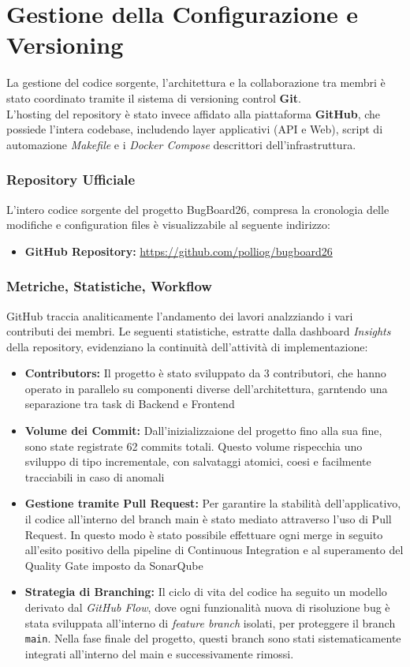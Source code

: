 \newpage
\chapter{Gestione della Configurazione e Versioning}
La gestione del codice sorgente, l'architettura e la collaborazione tra membri è stato coordinato tramite il sistema di versioning control \textbf{Git}. \\
L'hosting del repository è stato invece affidato alla piattaforma \textbf{GitHub}, che possiede l'intera codebase, includendo layer applicativi (API e Web), script di automazione \textit{Makefile} e i \textit{Docker Compose} descrittori dell'infrastruttura.

\subsection{Repository Ufficiale}
L'intero codice sorgente del progetto BugBoard26, compresa la cronologia delle modifiche e configuration files è visualizzabile al seguente indirizzo:
\begin{itemize}
    \item \textbf{GitHub Repository:} \url{https://github.com/polliog/bugboard26}
\end{itemize}

\subsection{Metriche, Statistiche, Workflow}
GitHub traccia analiticamente l'andamento dei lavori analzziando i vari contributi dei membri. Le seguenti statistiche, estratte dalla dashboard \textit{Insights} della repository, evidenziano la continuità dell'attività di implementazione:
\begin{itemize}
    \item \textbf{Contributors:} Il progetto è stato sviluppato da 3 contributori, che hanno operato in parallelo su componenti diverse dell'architettura, garntendo una separazione tra task di Backend e Frontend
    \item \textbf{Volume dei Commit:} Dall'inizializzaione del progetto fino alla sua fine, sono state registrate 62 commits totali. Questo volume rispecchia uno sviluppo di tipo incrementale, con salvataggi atomici, coesi e facilmente tracciabili in caso di anomali
    \item \textbf{Gestione tramite Pull Request:} Per garantire la stabilità dell'applicativo, il codice all'interno del branch main è stato mediato attraverso l'uso di Pull Request. In questo modo è stato possibile effettuare ogni merge in seguito all'esito positivo della pipeline di Continuous Integration e al superamento del Quality Gate imposto da SonarQube
    \item \textbf{Strategia di Branching:} Il ciclo di vita del codice ha seguito un modello derivato dal \textit{GitHub Flow}, dove ogni funzionalità nuova di risoluzione bug è stata sviluppata all'interno di \textit{feature branch} isolati, per proteggere il branch \texttt{main}. Nella fase finale del progetto, questi branch sono stati sistematicamente integrati all'interno del main e successivamente rimossi.
\end{itemize}